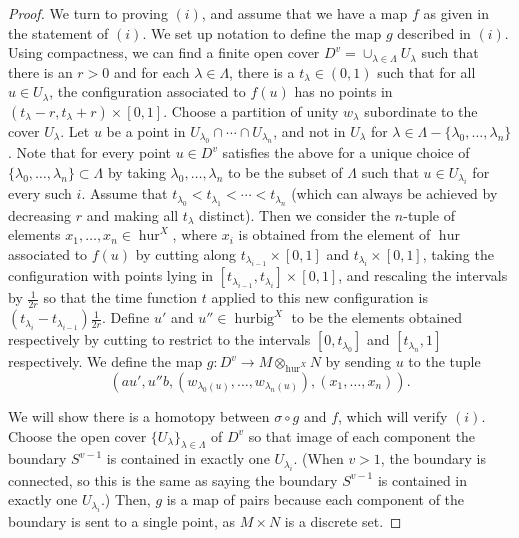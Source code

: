 \documentclass[12 pt]{amsart}
\theoremstyle{plain}
\theoremstyle{definition}
\theoremstyle{remark}
\numberwithin{equation}{section}
\begin{document}
\begin{proof}
	We turn to proving $(i)$, and assume that we have a map $f$ as given in
	the statement of $(i)$.
	We set up notation to define the map $g$ described in $(i)$.
	Using compactness, we can find a finite open
	cover $D^v = \cup_{\lambda \in \Lambda}U_{\lambda}$ such that there is
	an $r>0$ and for each $\lambda \in \Lambda$, there is a $t_{\lambda} \in
	(0,1)$ such that for all $u \in U_{\lambda}$, the configuration associated
	to $f(u)$ has no points in $(t_{\lambda}-r,t_{\lambda}+r)\times [0,1]$.
	Choose a partition of unity $w_{\lambda}$ subordinate to the cover $U_{\lambda}$. Let
	$u$ be a point in $U_{\lambda_0}\cap\cdots\cap U_{\lambda_n}$,
	and not in $U_{\lambda}$ for $\lambda \in \Lambda - \{\lambda_0, \ldots,
	\lambda_n\}$.
	Note that for every point $u \in D^v$ satisfies the above for a unique
	choice of $\{\lambda_0, \ldots, \lambda_n\} \subset \Lambda$ 
	by taking $\lambda_0,\ldots, \lambda_n$ to be the subset of $\Lambda$
	such that $u\in U_{\lambda_i}$ for every such $i$.
	Assume that
	$t_{\lambda_0}<t_{\lambda_1}<\cdots<t_{\lambda_n}$ (which can always be
	achieved by decreasing $r$ and making all $t_{\lambda}$ distinct). Then
	we consider the $n$-tuple of elements $x_1,\ldots,x_n \in \operatorname{hur}^{X}$, where $x_i$ is obtained from the element of $\operatorname{hur}$ associated to $f(u)$ by cutting along 
	$t_{\lambda_{i-1}} \times[0,1]$ and $t_{\lambda_i} \times[0,1]$, 
	taking the configuration with points lying in
	$[t_{\lambda_{i-1}},t_{\lambda_{i}}] \times[0,1]$, and rescaling the
	intervals by $\frac 1 {2r}$ so that the time function $t$ applied to
	this new configuration is $(t_{\lambda_i}-t_{\lambda_{i-1}})\frac 1 {2r}$.
	Define $u'$ and $u'' \in \operatorname{hurbig}^{X}$
	to be the elements 
	obtained respectively by cutting to restrict to the intervals
	$[0,t_{\lambda_{0}}]$ and $[t_{\lambda_n},1]$ respectively. 
	We define the map $g:D^{v} \to M\otimes_{\operatorname{hur}^{X}}N$ by sending $u$ 
	to the tuple $$(au',u''b,(w_{\lambda_{0}(u)},\ldots,w_{\lambda_{n}(u)}),
	(x_1,\ldots,x_n)).$$

	We will show there is a homotopy between $\sigma \circ g$ and  $f$,
which will verify $(i)$.
Choose the open cover $\{U_\lambda\}_{\lambda \in \Lambda}$ of $D^v$ so that image of each component the boundary
	$S^{v-1}$ is contained in exactly one $U_{\lambda_i}$. 
	(When $v > 1$, the boundary is connected, so this is the same as saying
	the boundary $S^{v-1}$ is contained in exactly one
	$U_{\lambda_i}$.)
	Then, $g$ is a map of
	pairs because each component of the boundary is sent to a single point,
	as $M\times N$ is a discrete set.
	


\end{proof}
\end{document}
